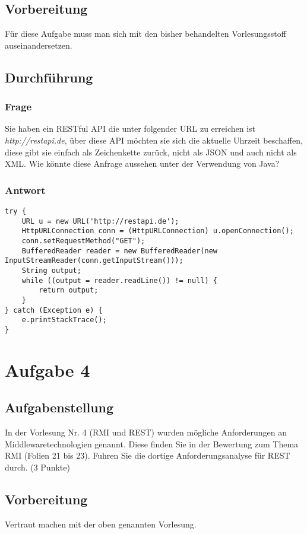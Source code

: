 \subsection{Vorbereitung}
Für diese Aufgabe muss man sich mit den bisher behandelten Vorlesungsstoff auseinandersetzen.

\subsection{Durchführung}

\subsubsection{Frage}
Sie haben ein RESTful API die unter folgender URL zu erreichen ist \textit{http://restapi.de}, über diese API möchten sie sich die aktuelle Uhrzeit beschaffen, diese gibt sie einfach als Zeichenkette zurück, nicht als JSON und auch nicht als XML. Wie könnte diese Anfrage aussehen unter der Verwendung von Java?

\subsubsection{Antwort}
\begin{lstlisting}
try {
	URL u = new URL('http://restapi.de');
	HttpURLConnection conn = (HttpURLConnection) u.openConnection();
	conn.setRequestMethod("GET");
	BufferedReader reader = new BufferedReader(new InputStreamReader(conn.getInputStream()));
	String output;
	while ((output = reader.readLine()) != null) {
		return output;
	}
} catch (Exception e) {
	e.printStackTrace();
}
\end{lstlisting}

\section{Aufgabe 4}

\subsection{Aufgabenstellung}
In der Vorlesung Nr. 4 (RMI und REST) wurden mögliche Anforderungen an Middlewaretechnologien
genannt. Diese finden Sie in der Bewertung zum Thema RMI (Folien 21
bis 23). Fuhren Sie die dortige Anforderungsanalyse für REST durch. (3 Punkte)

\subsection{Vorbereitung}
Vertraut machen mit der oben genannten Vorlesung.

